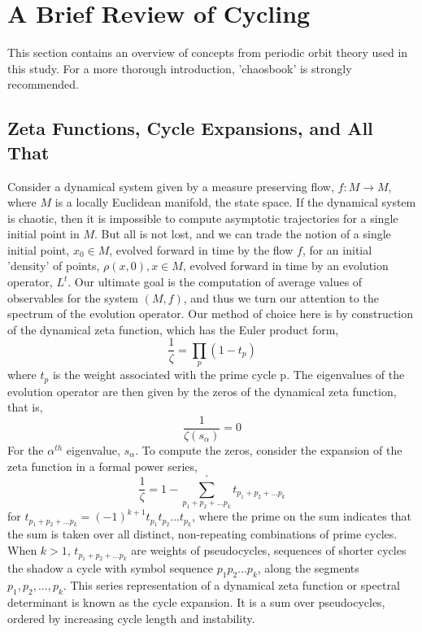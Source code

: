 \documentclass[pre,aps,twocolumn,showpacs,hyperref]{revtex4-1} %
\begin{document}
\section{A Brief Review of Cycling}
This section contains an overview of concepts from periodic orbit theory used in this study. For a more thorough introduction, 'chaosbook' is strongly recommended.
\subsection{Zeta Functions, Cycle Expansions, and All That}
Consider a dynamical system given by a measure preserving flow, $f: M\rightarrow M$, where $M$ is a locally Euclidean manifold, the state space. If the dynamical system is chaotic, then it is impossible to compute asymptotic trajectories for a single initial point in $M$. But all is not lost, and we can trade the notion of a single initial point, $x_{0}\in M$, evolved forward in time by the flow $f$, for an initial 'density' of points, $\rho (x, 0), x\in M$, evolved forward in time by an evolution operator, $L^{t}$.
\indent Our ultimate goal is the computation of average values of observables for the system $(M, f)$, and thus we turn our attention to the spectrum of the evolution operator. Our method of choice here is by construction of the dynamical zeta function, which has the Euler product form,
\begin{equation}
\frac{1}{\zeta} = \prod_{p} (1 - t_{p})
\end{equation}
where $t_{p}$ is the weight associated with the prime cycle p. The eigenvalues of the evolution operator are then given by the zeros of the dynamical zeta function, that is,
\begin{equation}
\frac{1}{\zeta (s_{\alpha})} = 0
\end{equation}
For the $\alpha^{th}$ eigenvalue, $s_{\alpha}$. To compute the zeros, consider the expansion of the zeta function in a formal power series,
\begin{equation}
\frac{1}{\zeta} = 1 - \sum_{p_{1}+p_{2}+...p_{k}}^{'}t_{p_{1}+p_{2}+...p_{k}}
\end{equation}
for $t_{p_{1}+p_{2}+...p_{k}} = (-1)^{k+1}t_{p_{1}}t_{p_{2}}...t_{p_{k}}$, where the prime on the sum indicates that the sum is taken over all distinct, non-repeating combinations of prime cycles. When $k>1$, $t_{p_{1}+p_{2}+...p_{k}}$ are weights of pseudocycles, sequences of shorter cycles the shadow a cycle with symbol sequence $p_{1}p_{2}...p_{k}$, along the segments $p_{1}, p_{2}, ..., p_{k}$. This series representation of a dynamical zeta function or spectral determinant is known as the cycle expansion. It is a sum over pseudocycles, ordered by increasing cycle length and instability.
\end{document}
